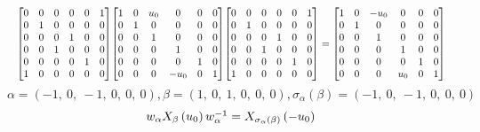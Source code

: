 \documentclass[11pt]{article}
\theoremstyle{definition}
\begin{document}
\[
\scaletoalign{\textwidth}{{\left[\begin{matrix}0 & 0 & 0 & 0 & 0 & 1\\0 & 1 & 0 & 0 & 0 & 0\\0 & 0 & 0 & 1 & 0 & 0\\0 & 0 & 1 & 0 & 0 & 0\\0 & 0 & 0 & 0 & 1 & 0\\1 & 0 & 0 & 0 & 0 & 0\end{matrix}\right]} {\left[\begin{matrix}1 & 0 & u_{0} & 0 & 0 & 0\\0 & 1 & 0 & 0 & 0 & 0\\0 & 0 & 1 & 0 & 0 & 0\\0 & 0 & 0 & 1 & 0 & 0\\0 & 0 & 0 & 0 & 1 & 0\\0 & 0 & 0 & - u_{0} & 0 & 1\end{matrix}\right]} {\left[\begin{matrix}0 & 0 & 0 & 0 & 0 & 1\\0 & 1 & 0 & 0 & 0 & 0\\0 & 0 & 0 & 1 & 0 & 0\\0 & 0 & 1 & 0 & 0 & 0\\0 & 0 & 0 & 0 & 1 & 0\\1 & 0 & 0 & 0 & 0 & 0\end{matrix}\right]} = {\left[\begin{matrix}1 & 0 & - u_{0} & 0 & 0 & 0\\0 & 1 & 0 & 0 & 0 & 0\\0 & 0 & 1 & 0 & 0 & 0\\0 & 0 & 0 & 1 & 0 & 0\\0 & 0 & 0 & 0 & 1 & 0\\0 & 0 & 0 & u_{0} & 0 & 1\end{matrix}\right]}}
\]
\[
\alpha = \left( -1, \  0, \  -1, \  0, \  0, \  0\right), \beta = \left( 1, \  0, \  1, \  0, \  0, \  0\right), \sigma_{\alpha}(\beta) = \left( -1, \  0, \  -1, \  0, \  0, \  0\right)
\]
\[
\scaletoalign{\textwidth}{w_{\alpha} X_{\beta}\left(u_{0}\right) w_{\alpha}^{-1} = X_{\sigma_{\alpha}\left(\beta\right)}\left(- u_{0}\right)}
\]
\end{document}
